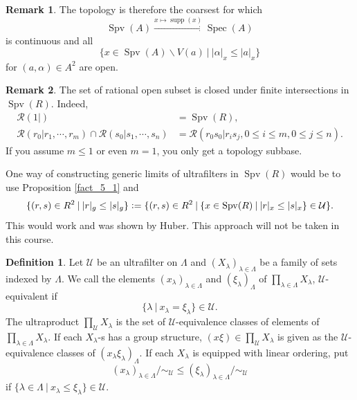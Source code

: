 \documentclass[10pt]{article}
\numberwithin{equation}{section}
\theoremstyle{definition}
\newtheorem{definition}{Definition}[subsection]
\newtheorem{remark}{Remark}[subsection]
\DeclareMathOperator{\supp}{supp}
\DeclareMathOperator{\Spec}{Spec}
\DeclareMathOperator{\Spv}{Spv}
\newcommand{\defeq}{\vcentcolon=}
\newcommand{\U}[0]{\mathcal{U}}
\newcommand{\sep}[0]{\:|\:}
\begin{document}
\begin{remark}
    The topology is therefore the coarsest for which
    \begin{equation*}
        \Spv(A)\stackrel{x\mapsto\supp(x)}{\to}\Spec(A)
    \end{equation*}
    is continuous and all
    \begin{equation*}
        \{x\in\Spv(A)\backslash V(a)\sep \vert\alpha\vert_x\leq\vert a\vert_x\}
    \end{equation*}
    for $(a,\alpha)\in A^2$ are open.
\end{remark}
\begin{remark}
    The set of rational open subset is closed under finite intersections in $\Spv(R)$. Indeed,
    \begin{align*}
        \mathcal{R}(1|) &= \Spv(R),\\
        \mathcal{R}(r_0|r_1,\cdots,r_m)\cap\mathcal{R}(s_0|s_1,\cdots,s_n) &= \mathcal{R}(r_0s_0|r_is_j,0\leq i\leq m,0\leq j\leq n).
    \end{align*}
    If you assume $m\leq 1$ or even $m=1$, you only get a topology subbase.
\end{remark}
One way of constructing generic limits of ultrafilters in $\Spv(R)$ would be to use Proposition \ref{fact_5_1} and
\begin{equation*}
    \{(r,s)\in R^2\sep \vert r\vert_g\leq\vert s\vert_g\}\defeq \{(r,s)\in R^2\sep \{x\in\Spv(R)\sep \vert r\vert_x\leq \vert s\vert_x\}\in\U\}.
\end{equation*}
This would work and was shown by Huber. This approach will not be taken in this course.
\begin{definition}
    \label{definition_5_6}
    Let $\U$ be an ultrafilter on $\Lambda$ and $(X_\lambda)_{\lambda\in\Lambda}$ be a family of sets indexed by $\Lambda$. We call the elements $(x_\lambda)_{\lambda\in\Lambda}$ and $(\xi_\lambda)_{\Lambda}$ of $\prod_{\lambda\in\Lambda}X_\lambda$, $\U$-equivalent if
    \begin{equation*}
        \{\lambda\sep x_\lambda=\xi_\lambda\}\in\U.
    \end{equation*}
    The ultraproduct $\prod_{\U}X_\lambda$ is the set of $\U$-equivalence classes of elements of $\prod_{\lambda\in\Lambda}X_\lambda$. If each $X_\lambda$-s has a group structure, $(x\xi)\in\prod_\U X_\lambda$ is given as the $\U$-equivalence classes of $(x_\lambda\xi_\lambda)_\Lambda$. If each $X_\lambda$ is equipped with linear ordering, put
    \begin{equation*}
        (x_\lambda)_{\lambda\in\Lambda}/\sim_\U \leq (\xi_\lambda)_{\lambda\in\Lambda}/\sim_\U
    \end{equation*}
    if $\{\lambda\in\Lambda\sep x_\lambda\leq\xi_\lambda\}\in\U$.
\end{definition}
\end{document}
